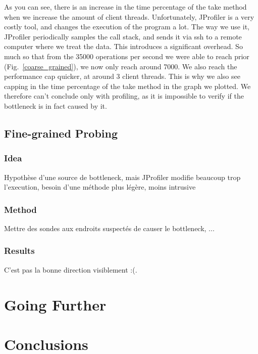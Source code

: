\documentclass[conference]{IEEEtran}
\begin{document}
As you can see, there is an increase in the time percentage of the take method when we increase the amount of client threads. Unfortunately, JProfiler is a very costly tool, and changes the execution of the program a lot. The way we use it, JProfiler periodically samples the call stack, and sends it via ssh to a remote computer where we treat the data. This introduces a significant overhead. So much so that from the 35000 operations per second we were able to reach prior (Fig.~\ref{coarse_grained}), we now only reach around 7000. We also reach the performance cap quicker, at around 3 client threads. This is why we also see capping in the time percentage of the take method in the graph we plotted. We therefore can't conclude only with profiling, as it is impossible to verify if the bottleneck is in fact caused by it. 

\subsection{Fine-grained Probing}
\subsubsection{Idea}
Hypothèse d'une source de bottleneck, mais JProfiler modifie beaucoup trop l'execution, besoin d'une méthode plus légère, moins intrusive

\subsubsection{Method}
Mettre des sondes aux endroits suspectés de causer le bottleneck, ...
\subsubsection{Results}
C'est pas la bonne direction visiblement :(.

\bigbreak


\section{Going Further}
\bigbreak
\section{Conclusions}
\end{document}
